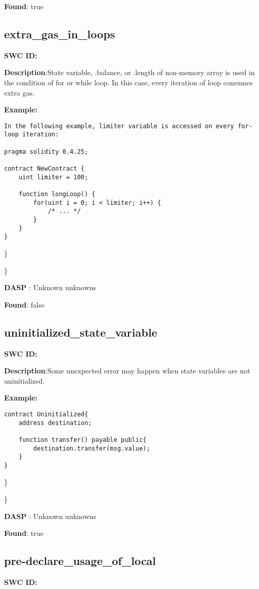 \documentclass{article}
\begin{document}
\textbf{Found}: true

\subsection{extra\_gas\_in\_loops} 
\textbf{SWC \textunderscore ID:} 

\textbf{Description}:State variable, .balance, or .length of non-memory array is used in the condition of for or while loop. In this case, every iteration of loop consumes extra gas.


\textbf{Example:} 
\begin{verbatim}
In the following example, limiter variable is accessed on every for-loop iteration:

pragma solidity 0.4.25;

contract NewContract {
    uint limiter = 100;

    function longLoop() {
        for(uint i = 0; i < limiter; i++) {
            /* ... */
        }
    }
}

\end{verbatim}\} 

\} 

\textbf{DASP} : Unknown unknowns

\textbf{Found}: false

\subsection{uninitialized\_state\_variable} 
\textbf{SWC \textunderscore ID:} 

\textbf{Description}:Some unexpected error may happen when state variables are not uninitialized.


\textbf{Example:} 
\begin{verbatim}
contract Uninitialized{
    address destination;

    function transfer() payable public{
        destination.transfer(msg.value);
    }
}

\end{verbatim}\} 

\} 

\textbf{DASP} : Unknown unknowns

\textbf{Found}: true

\subsection{pre-declare\_usage\_of\_local} 
\textbf{SWC \textunderscore ID:} 
\end{document}

